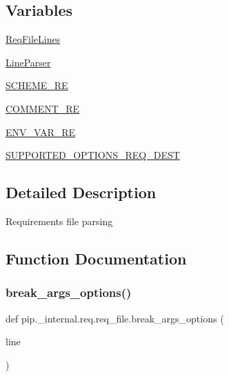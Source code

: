 \subsection*{Variables}
\begin{DoxyCompactItemize}
\item 
\hyperlink{namespacepip_1_1__internal_1_1req_1_1req__file_a6bcd7f95031c74c3a0c6950f59b7ae2b}{Req\+File\+Lines}
\item 
\hyperlink{namespacepip_1_1__internal_1_1req_1_1req__file_aef579255ac99d908c14a7231cc5bb5a1}{Line\+Parser}
\item 
\hyperlink{namespacepip_1_1__internal_1_1req_1_1req__file_a07a6d7a4863b3e41652b385ec7f87d7b}{S\+C\+H\+E\+M\+E\+\_\+\+RE}
\item 
\hyperlink{namespacepip_1_1__internal_1_1req_1_1req__file_ab54ff2bcd8ab7312fb2912154934eee0}{C\+O\+M\+M\+E\+N\+T\+\_\+\+RE}
\item 
\hyperlink{namespacepip_1_1__internal_1_1req_1_1req__file_a51f683b92d8d3ccf2663d3b7ac1210c6}{E\+N\+V\+\_\+\+V\+A\+R\+\_\+\+RE}
\item 
\hyperlink{namespacepip_1_1__internal_1_1req_1_1req__file_a1d49c790f14768fcda21333b56ad5479}{S\+U\+P\+P\+O\+R\+T\+E\+D\+\_\+\+O\+P\+T\+I\+O\+N\+S\+\_\+\+R\+E\+Q\+\_\+\+D\+E\+ST}
\end{DoxyCompactItemize}


\subsection{Detailed Description}
\begin{DoxyVerb}Requirements file parsing
\end{DoxyVerb}
 

\subsection{Function Documentation}
\mbox{\label{namespacepip_1_1__internal_1_1req_1_1req__file_a5fae6faa1552fba8b831c5f710fc3e14}} 
\subsubsection{\texorpdfstring{break\+\_\+args\+\_\+options()}{break\_args\_options()}}
{\footnotesize\ttfamily def pip.\+\_\+internal.\+req.\+req\+\_\+file.\+break\+\_\+args\+\_\+options (\begin{DoxyParamCaption}\item[{}]{line }\end{DoxyParamCaption})}

